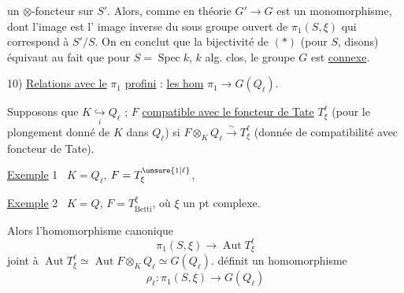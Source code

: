 un  $\otimes$-foncteur  sur $S'$. Alors, comme en théorie  $G'\longrightarrow G$ est un monomorphisme, dont l'image est l' image inverse  du sous groupe ouvert de $\pi_1(S,\xi)$ qui correspond à $S'/S$. On en conclut que la bijectivité de $(*)$  (pour  $S$, disons) équivaut au fait que pour $S=\operatorname{Spec} k$, $k$ alg. clos, le  groupe $G$ est \uline{connexe}.

10) \uline{Relations avec le} $\pi_1$ \uline{profini} : \uline{les hom} $\pi_1\to G(Q_\ell)$.

Supposons  que $K\underset{i}{\hookrightarrow}Q_\ell$ ;  $F$   \uline{compatible avec le foncteur de Tate} $T^\ell_\xi$ (pour le plongement donné de $K$ dans $Q_\ell$) si $F\otimes_K Q_\ell\xrightarrow{\sim}T^\ell_\xi$ (donnée de compatibilité avec foncteur de Tate).

\uline{Exemple} 1 \ $K=Q_\ell$, $F=T^{\unsure{1|\ell}}_\xi$,

\uline{Exemple} 2 \ $K=Q$, $F=T_{\mathrm{Betti}}^\xi$, où $\xi$ un pt complexe.

Alors  l'homomorphisme canonique
\[
\pi_1(S,\xi)\to\operatorname{Aut}T^\ell_\xi
\]
 joint à $\operatorname{Aut}T^\ell_\xi\simeq\operatorname{Aut}F\otimes_{K}Q_\ell\simeq G(Q_\ell)$.
définit un homomorphisme
\[
\boxed{\rho_\ell:\pi_1(S,\xi)\longrightarrow G(Q_\ell)}
\]

